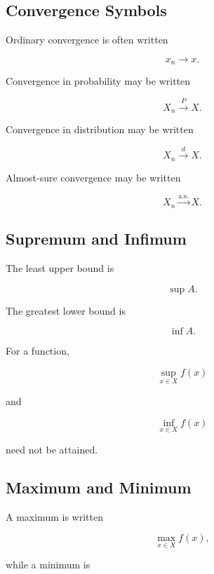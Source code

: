\subsection{Convergence Symbols}
\label{subsec:convergence-symbols-reference}

Ordinary convergence is often written

\[
\boxed{
x_n\to x.
}
\]

Convergence in probability may be written

\[
\boxed{
X_n
\xrightarrow{P}
X.
}
\]

Convergence in distribution may be written

\[
\boxed{
X_n
\xrightarrow{d}
X.
}
\]

Almost-sure convergence may be written

\[
\boxed{
X_n
\xrightarrow{\mathrm{a.s.}}
X.
}
\]

\subsection{Supremum and Infimum}
\label{subsec:supremum-infimum-reference}

The least upper bound is

\[
\boxed{
\sup A.
}
\]

The greatest lower bound is

\[
\boxed{
\inf A.
}
\]

For a function,

\[
\boxed{
\sup_{x\in X}f(x)
}
\]

and

\[
\boxed{
\inf_{x\in X}f(x)
}
\]

need not be attained.

\subsection{Maximum and Minimum}
\label{subsec:max-min-reference}

A maximum is written

\[
\boxed{
\max_{x\in X}f(x),
}
\]

while a minimum is

